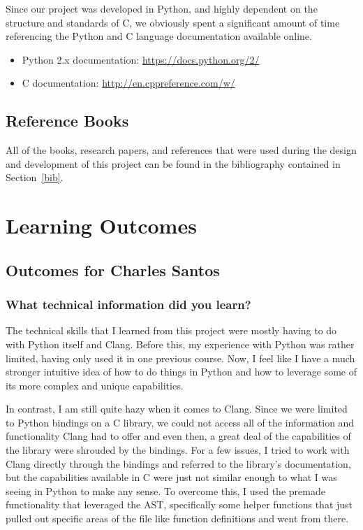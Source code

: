\documentclass[11pt]{scrreprt}
\begin{document}
Since our project was developed in Python, and highly dependent on the structure and standards of C, we obviously spent a significant amount of time referencing the Python and C language documentation available online.

\begin{itemize}
	\item Python 2.x documentation: \url{https://docs.python.org/2/}
	\item C documentation: \url{http://en.cppreference.com/w/}
\end{itemize}

\section{Reference Books}

All of the books, research papers, and references that were used during the design and development of this project can be found in the bibliography contained in Section~\ref{bib}.

\chapter{Learning Outcomes}

\section{Outcomes for Charles Santos}

\subsection{What technical information did you learn?}

The technical skills that I learned from this project were mostly having to do with Python itself and Clang.
Before this, my experience with Python was rather limited, having only used it in one previous course.
Now, I feel like I have a much stronger intuitive idea of how to do things in Python and how to leverage some of its more complex and unique capabilities.

In contrast, I am still quite hazy when it comes to Clang.
Since we were limited to Python bindings on a C library, we could not access all of the information and functionality Clang had to offer and even then, a great deal of the capabilities of the library were shrouded by the bindings.
For a few issues, I tried to work with Clang directly through the bindings and referred to the library's documentation, but the capabilities available in C were just not similar enough to what I was seeing in Python to make any sense.
To overcome this, I used the premade functionality that leveraged the AST, specifically some helper functions that just pulled out specific areas of the file like function definitions and went from there.
\end{document}
